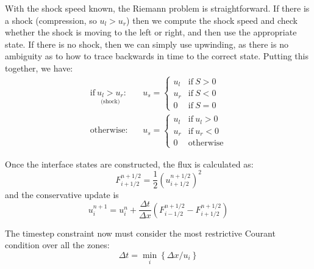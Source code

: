 With the shock speed known, the Riemann problem is straightforward.  If there
is a shock (compression, so $u_l > u_r$) then we compute the shock speed and
check whether the shock is moving to the left or right, and then use the appropriate
state.  If there is no shock, then we can simply use upwinding, as there is no
ambiguity as to how to trace backwards in time to the correct state.
Putting this together, we have:
\begin{eqnarray}
\mathrm{if~} \underset{\text{(shock)}}{u_l > u_r}:&& u_s = \left \{ \begin{array}{cl}
                u_l & \mathrm{if~} S > 0 \\ 
                u_r & \mathrm{if~} S < 0 \\
                0   & \mathrm{if~} S = 0 \end{array} \right .   \\[1em]
%
\mathrm{otherwise:}&& u_s = \left \{ \begin{array}{clc}
                u_l & \mathrm{if~} u_l > 0 \\  
                u_r & \mathrm{if~} u_r < 0 \\  
                0   & \mathrm{otherwise} \end{array} \right .   
\end{eqnarray}
               
Once the interface states are constructed, the flux is calculated as:
\begin{equation}
F^{n+1/2}_{i+1/2} = \frac{1}{2} \left (u_{i+1/2}^{n+1/2} \right )^2
\end{equation}
and the conservative update is
\begin{equation}
u_i^{n+1} = u_i^n + \frac{\Delta t}{\Delta x} 
   \left ( F_{i-1/2}^{n+1/2} - F_{i+1/2}^{n+1/2} \right )
\end{equation}

The timestep constraint now must consider the most restrictive Courant 
condition over all the zones:
\begin{equation}
\Delta t = \min_i \left \{ \Delta x / u_i \right \}
\end{equation}


